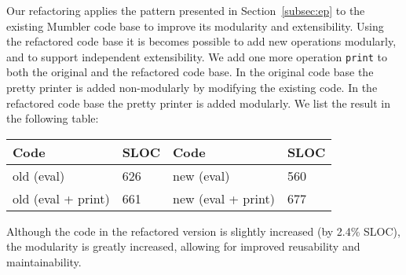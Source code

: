 Our refactoring applies the pattern presented in
Section~\ref{subsec:ep} to the existing Mumbler code base to improve
its modularity and extensibility. Using the refactored code base it is 
becomes possible to add new operations modularly, and to support
independent extensibility. We add one more
operation \texttt{print} to both the original and the refactored code
base. In the original code base the pretty printer is added
non-modularly by modifying the existing code. In the refactored code
base the pretty printer is added modularly. We list the result in the following
table:

\begin{tabular}{|l|l|l|l|}
\hline
\rowcolor[HTML]{C0C0C0} 
Code               & SLOC & Code               & SLOC \\ \hline
old (eval)         & 626  & new (eval)         & 560  \\ \hline
old (eval + print) & 661  & new (eval + print) & 677  \\ \hline
\end{tabular}
\noindent Although the code in the refactored version is slightly increased (by 2.4\% SLOC), the
modularity is greatly increased, allowing for improved reusability and maintainability.


